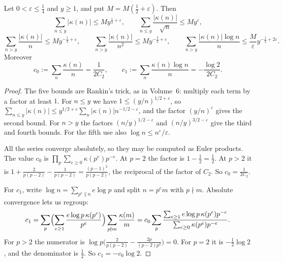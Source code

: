 \begin{lemma}\label{lem:kappa}
Let $0<\varepsilon\le\frac14$ and $y\ge1$, and put $M=M(\frac12+\varepsilon)$. Then
\[
\sum_{n\le y}|\kappa(n)|\le My^{\frac12+\varepsilon},\qquad\sum_{n\le y}\frac{|\kappa(n)|}{\sqrt n}\le My^\varepsilon,
\]
\[
\sum_{n>y}\frac{|\kappa(n)|}n\le My^{-\frac12+\varepsilon},\qquad\sum_{n>y}\frac{|\kappa(n)|}{n^2}\le My^{-\frac32+\varepsilon},\qquad\sum_{n>y}\frac{|\kappa(n)|\log n}n\le\frac M\varepsilon y^{-\frac12+2\varepsilon}.
\]
Moreover
\[
c_0:=\sum_n\frac{\kappa(n)}n=\frac1{2C_2},\qquad c_1:=\sum_n\frac{\kappa(n)\log n}n=-\frac{\log2}{2C_2}.
\]
\end{lemma}
\begin{proof}
The five bounds are Rankin's trick, as in Volume~6: multiply each term by a factor at least $1$. For $n\le y$ we have $1\le(y/n)^{1/2+\varepsilon}$, so $\sum_{n\le y}|\kappa(n)|\le y^{1/2+\varepsilon}\sum_n|\kappa(n)|n^{-1/2-\varepsilon}$, and the factor $(y/n)^\varepsilon$ gives the second bound. For $n>y$ the factors $(n/y)^{1/2-\varepsilon}$ and $(n/y)^{3/2-\varepsilon}$ give the third and fourth bounds. For the fifth use also $\log n\le n^\varepsilon/\varepsilon$.

All the series converge absolutely, so they may be computed as Euler products. The value $c_0$ is $\prod_p\sum_{e\ge0}\kappa(p^e)p^{-e}$. At $p=2$ the factor is $1-\frac12=\frac12$. At $p>2$ it is $1+\frac2{p(p-2)}-\frac1{p(p-2)}=\frac{(p-1)^2}{p(p-2)}$, the reciprocal of the factor of $C_2$. So $c_0=\frac1{2C_2}$.

For $c_1$, write $\log n=\sum_{p^e\parallel n}e\log p$ and split $n=p^em$ with $p\nmid m$. Absolute convergence lets us regroup:
\[
c_1=\sum_p\Bigl(\sum_{e\ge1}\frac{e\log p\,\kappa(p^e)}{p^e}\Bigr)\sum_{p\nmid m}\frac{\kappa(m)}m=c_0\sum_p\frac{\sum_{e\ge1}e\log p\,\kappa(p^e)p^{-e}}{\sum_{e\ge0}\kappa(p^e)p^{-e}}.
\]
For $p>2$ the numerator is $\log p\bigl(\frac2{p(p-2)}-\frac{2p}{(p-2)p^2}\bigr)=0$. For $p=2$ it is $-\frac12\log2$, and the denominator is $\frac12$. So $c_1=-c_0\log2$.
\end{proof}

